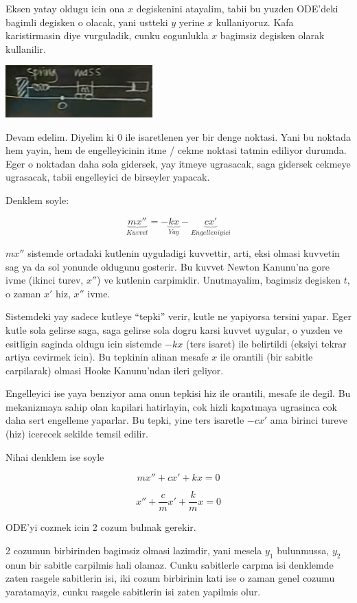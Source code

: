 \documentclass[12pt,fleqn]{article}
\begin{document}
Eksen yatay oldugu icin ona $x$ degiskenini atayalim, tabii bu yuzden
ODE'deki bagimli degisken o olacak, yani ustteki $y$ yerine $x$
kullaniyoruz. Kafa karistirmasin diye vurguladik, cunku cogunlukla $x$ bagimsiz
degisken olarak kullanilir. 

\includegraphics[height=2cm]{9_2.png}

Devam edelim. Diyelim ki 0 ile isaretlenen yer bir denge noktasi. Yani bu
noktada hem yayin, hem de engelleyicinin itme / cekme noktasi tatmin
ediliyor durumda. Eger o noktadan daha sola gidersek, yay itmeye ugrasacak,
saga gidersek cekmeye ugrasacak, tabii engelleyici de birseyler yapacak. 

Denklem soyle: 

\[ \underbrace{mx''}_{Kuvvet} =
- \underbrace{kx}_{Yay} 
- \underbrace{cx'}_{Engelleniyici}
\]

$mx''$ sistemde ortadaki kutlenin uyguladigi kuvvettir, arti, eksi olmasi
kuvvetin sag ya da sol yonunde oldugunu gosterir. Bu kuvvet Newton Kanunu'na
gore ivme (ikinci turev, $x''$) ve kutlenin carpimidir. Unutmayalim,
bagimsiz degisken $t$, o zaman $x'$ hiz, $x''$ ivme.

Sistemdeki yay sadece kutleye ``tepki'' verir, kutle ne yapiyorsa tersini
yapar. Eger kutle sola gelirse saga, saga gelirse sola dogru karsi kuvvet
uygular, o yuzden ve esitligin saginda oldugu icin sistemde $-kx$ (ters
isaret) ile belirtildi (eksiyi tekrar artiya cevirmek icin). Bu tepkinin
alinan mesafe $x$ ile orantili (bir sabitle carpilarak) olmasi Hooke
Kanunu'ndan ileri geliyor.

Engelleyici ise yaya benziyor ama onun tepkisi hiz ile orantili, mesafe ile
degil. Bu mekanizmaya sahip olan kapilari hatirlayin, cok hizli kapatmaya
ugrasinca cok daha sert engelleme yaparlar. Bu tepki, yine ters isaretle
$-cx'$ ama birinci tureve (hiz) icerecek sekilde temsil edilir.

Nihai denklem ise soyle

\[ mx'' + cx' + kx = 0 \]

\[ x'' + \frac{c}{m}x' + \frac{k}{m}x = 0 \]

ODE'yi cozmek icin 2 cozum bulmak gerekir. 

2 cozumun birbirinden bagimsiz olmasi lazimdir, yani mesela $y_1$
bulunmussa, $y_2$ onun bir sabitle carpilmis hali olamaz. Cunku sabitlerle
carpma isi denklemde zaten rasgele sabitlerin isi, iki cozum birbirinin
kati ise o zaman genel cozumu yaratamayiz, cunku rasgele sabitlerin isi
zaten yapilmis olur.
\end{document}
